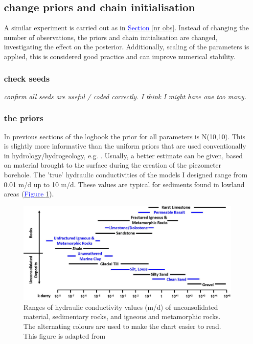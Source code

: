 \subsection{change priors and chain initialisation}
A similar experiment is carried out as in \hyperref[nr obs]{\textcolor{blue}{Section }\ref{nr obs}}. Instead of changing the number of observations, the priors and chain initialisation are changed, investigating the effect on the posterior. Additionally, scaling of the parameters is applied, this is considered good practice and can improve numerical stability. 

\subsubsection{check seeds}
\textit{confirm all seeds are useful / coded correctly. I think I might have one too many.}


\subsubsection{the priors}
In previous sections of the logbook the prior for all parameters is N(10,10). This is slightly more informative than the uniform priors that are used conventionally in hydrology/hydrogeology, e.g. \cite{vrugt2009accelerating}.  Usually, a better estimate can be given, based on material brought to the surface during the creation of the piezometer borehole. The 'true' hydraulic conductivities of the models I designed range from 0.01 m/d up to 10 m/d. These values are typical for sediments found in lowland areas (\hyperref[fig_logbook8_k]{\textcolor{blue}{Figure }\ref{fig_logbook8_k}}). 

\begin{figure}[ht]
\centering
\includegraphics[width=1.0\textwidth]{Figures/appendix_figs/logbook8_hydraulic_conductivity_range.jpg}
\caption{Ranges of hydraulic conductivity values (m/d) of unconsolidated material, sedimentary rocks, and igneous and metamorphic rocks. The alternating colours are used to make the chart easier to read. This figure is adapted from \cite{woessner2020hydrogeologic}}\label{fig_logbook8_k} %
\end{figure}

